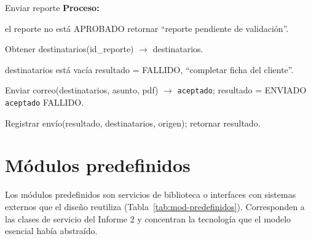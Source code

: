 \begin{modspec}{Enviar reporte}
\textbf{Proceso:}
\begin{logica}
    \item {} el reporte no está APROBADO  retornar ``reporte pendiente de
    validación''.
    \item Obtener destinatarios(id\_reporte) $\rightarrow$ destinatarios.
    \item {} destinatarios está vacía  resultado = FALLIDO, ``completar
    ficha del cliente''.
    \item {} Enviar correo(destinatarios, asunto, pdf) $\rightarrow$
    \texttt{aceptado}; resultado = ENVIADO  \texttt{aceptado}  FALLIDO.
    \item Registrar envío(resultado, destinatarios, origen); retornar resultado.
\end{logica}
\end{modspec}

\section{Módulos predefinidos}

Los módulos predefinidos son servicios de biblioteca o interfaces con sistemas externos que
el diseño reutiliza (Tabla~\ref{tab:mod-predefinidos}). Corresponden a las clases de servicio
del Informe 2 y concentran la tecnología que el modelo esencial había abstraído.


